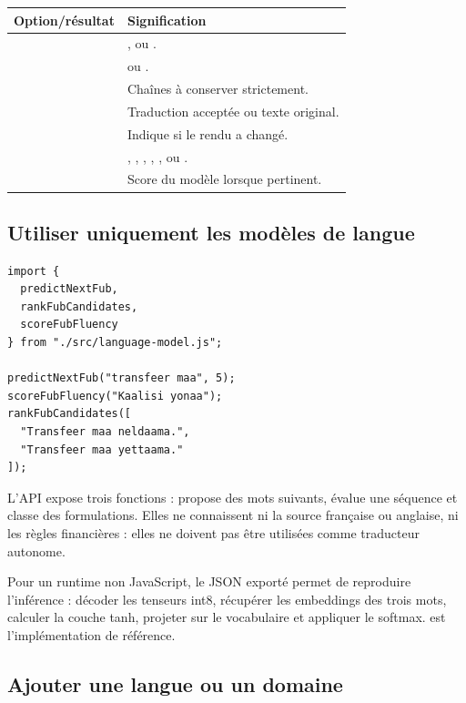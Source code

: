 \begin{tabularx}{\linewidth}{@{}|L{38mm}|Y|@{}}
\hline
\textbf{Option/résultat} & \textbf{Signification}\\
\hline
{} & ,  ou .\\
\hline
{} &  ou .\\
\hline
{} & Chaînes à conserver strictement.\\
\hline
{} & Traduction acceptée ou texte original.\\
\hline
{} & Indique si le rendu a changé.\\
\hline
{} &
, , ,
, ,  ou
.\\
\hline
{} & Score du modèle lorsque pertinent.\\
\hline
\end{tabularx}

\subsection{Utiliser uniquement les modèles de langue}

\begin{lstlisting}[language={}]
import {
  predictNextFub,
  rankFubCandidates,
  scoreFubFluency
} from "./src/language-model.js";

predictNextFub("transfeer maa", 5);
scoreFubFluency("Kaalisi yonaa");
rankFubCandidates([
  "Transfeer maa neldaama.",
  "Transfeer maa yettaama."
]);
\end{lstlisting}

L’API expose trois fonctions :  propose des mots
suivants,  évalue une séquence  et
 classe des formulations. Elles ne connaissent ni
la source française ou anglaise, ni les règles financières : elles ne doivent
pas être utilisées comme traducteur autonome.

Pour un runtime non JavaScript, le JSON exporté permet de reproduire
l’inférence : décoder les tenseurs int8, récupérer les embeddings des trois
mots, calculer la couche tanh, projeter sur le vocabulaire et appliquer le
softmax.  est l’implémentation de référence.

\subsection{Ajouter une langue ou un domaine}

